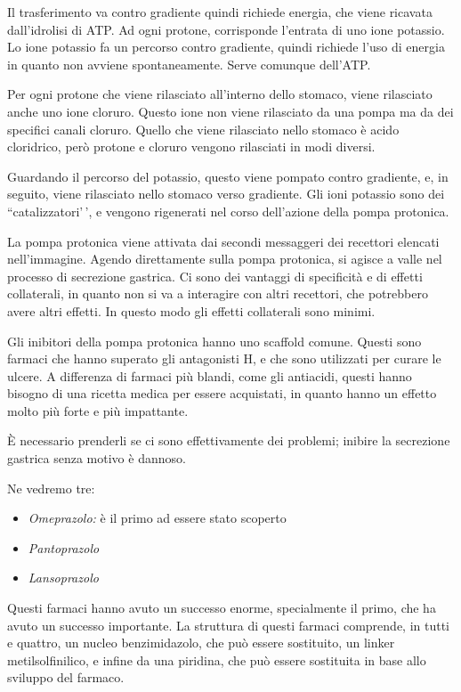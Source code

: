 Il trasferimento va contro gradiente quindi richiede energia, che viene
ricavata dall'idrolisi di ATP.
Ad ogni protone, corrisponde l'entrata di uno ione potassio.
Lo ione potassio fa un percorso contro gradiente, quindi richiede l'uso
di energia in quanto non avviene spontaneamente. Serve comunque
dell'ATP.

Per ogni protone che viene rilasciato all'interno dello stomaco, viene
rilasciato anche uno ione cloruro. Questo ione non viene rilasciato da
una pompa ma da dei specifici canali cloruro.
Quello che viene rilasciato nello stomaco è acido cloridrico, però
protone e cloruro vengono rilasciati in modi diversi.

Guardando il percorso del potassio, questo viene pompato contro
gradiente, e, in seguito, viene rilasciato nello stomaco verso
gradiente. Gli ioni potassio sono dei ``catalizzatori'\,', e vengono
rigenerati nel corso dell'azione della pompa protonica.

La pompa protonica viene attivata dai secondi messaggeri dei recettori
elencati nell'immagine. Agendo direttamente sulla pompa protonica, si
agisce a valle nel processo di secrezione gastrica. Ci sono dei vantaggi
di specificità e di effetti collaterali, in quanto non si va a
interagire con altri recettori, che potrebbero avere altri effetti. In
questo modo gli effetti collaterali sono minimi.

Gli inibitori della pompa protonica hanno uno scaffold comune. Questi
sono farmaci che hanno superato gli antagonisti H, e che sono
utilizzati per curare le ulcere.
A differenza di farmaci più blandi, come gli antiacidi, questi hanno
bisogno di una ricetta medica per essere acquistati, in quanto hanno un
effetto molto più forte e più impattante.

È necessario prenderli se ci sono effettivamente dei problemi; inibire
la secrezione gastrica senza motivo è dannoso.

Ne vedremo tre:
\begin{itemize}
\item
\emph{Omeprazolo:} è il primo ad essere stato scoperto
\item
\emph{Pantoprazolo}
\item
\emph{Lansoprazolo}
\end{itemize}

Questi farmaci hanno avuto un successo enorme, specialmente il primo,
che ha avuto un successo importante. La struttura di questi farmaci
comprende, in tutti e quattro, un nucleo benzimidazolo, che può essere
sostituito, un linker metilsolfinilico, e infine da una piridina, che
può essere sostituita in base allo sviluppo del farmaco.

